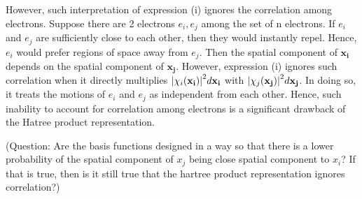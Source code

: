 \documentclass{article}
\begin{document}
        However, such interpretation of expression (i) ignores the correlation
        among electrons. Suppose there are 2 electrons \(e_i, e_j\) among the set
        of n electrons. If \(e_i\) and \(e_j\) are sufficiently close to each
        other, then they would instantly repel. Hence, \(e_i\) would prefer
        regions of space away from \(e_j\). Then the spatial component of
        \(\mathbf{x_i}\) depends on the spatial component of \(\mathbf{x_j}\).
        However, expression (i) ignores such correlation when it directly
        multiplies \(\abs{\chi_i(\mathbf{x_i})}^{2}d\mathbf{x_i}\) with
        \(\abs{\chi_j(\mathbf{x_j})}^{2}d\mathbf{x_j}\). In doing so, it treats
        the motions of \(e_i\) and \(e_j\) as independent from each other. Hence,
        such inability to account for correlation among electrons is a significant
        drawback of the Hatree product representation.

        (Question: Are the basis functions designed in a way so that there
        is a lower probability of the spatial component of \(x_j\) being close
        spatial component to \(x_i\)? If that is true, then is it still true
        that the hartree product representation ignores correlation?)


\end{document}
